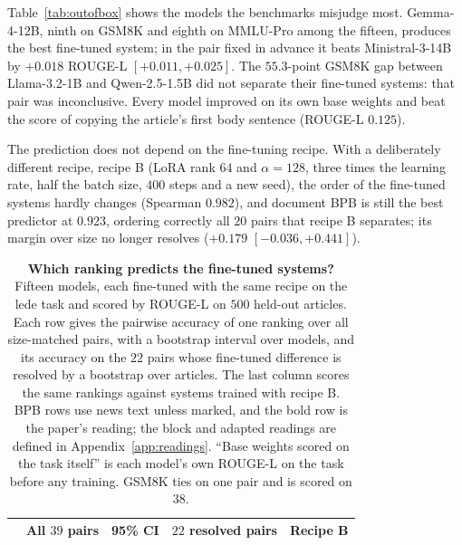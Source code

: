 \documentclass[10pt]{article}
\begin{document}
Table~\ref{tab:outofbox} shows the models the benchmarks misjudge most. Gemma-4-12B, ninth on GSM8K
and eighth on MMLU-Pro among the fifteen, produces the best fine-tuned system; in the pair fixed in
advance it beats Ministral-3-14B by $+0.018$ ROUGE-L $[+0.011, +0.025]$. The $55.3$-point GSM8K gap
between Llama-3.2-1B and Qwen-2.5-1.5B did not separate their fine-tuned systems: that pair was
inconclusive. Every model improved on its own base weights and beat the score of copying the
article's first body sentence (ROUGE-L $0.125$).

The prediction does not depend on the fine-tuning recipe. With a deliberately different recipe,
recipe B (LoRA rank $64$ and $\alpha{=}128$, three times the learning rate, half the batch size, $400$
steps and a new seed), the order of the fine-tuned systems hardly changes (Spearman $0.982$), and
document BPB is still the best predictor at $0.923$, ordering correctly all $20$ pairs that recipe B
separates; its margin over size no longer resolves ($+0.179$ $[-0.036, +0.441]$).

\begin{table}[t]
\centering\small
\begin{tabular}{lcccc}
\toprule
& \textbf{All $39$ pairs} & \textbf{95\% CI} & \textbf{$22$ resolved pairs} & \textbf{Recipe B} \\
\midrule

\bottomrule
\end{tabular}
\caption{\textbf{Which ranking predicts the fine-tuned systems?} Fifteen models, each fine-tuned
with the same recipe on the lede task and scored by ROUGE-L on $500$ held-out articles. Each row gives
the pairwise accuracy of one ranking over all size-matched pairs, with a bootstrap interval over
models, and its accuracy on the $22$ pairs whose fine-tuned difference is resolved by a bootstrap
over articles. The last column scores the same rankings against systems trained with recipe B.
BPB rows use news text unless marked, and the bold row is the paper's reading; the block and
adapted readings are defined in Appendix~\ref{app:readings}. ``Base weights scored on the task
itself'' is each model's own ROUGE-L on the task before any training. GSM8K ties on one pair and
is scored on $38$.}
\label{tab:downstream}
\end{table}
\end{document}
